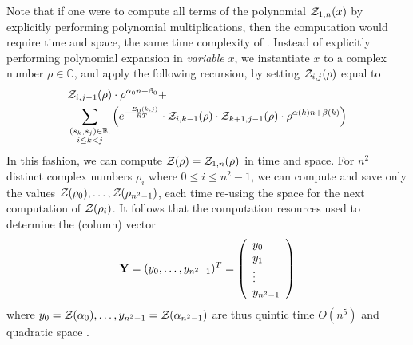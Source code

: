 Note that if one were to compute all terms of the polynomial ${\mathcal Z}_{1,n}(x)$
by explicitly performing polynomial multiplications,
then the computation would require  time and  space, the
same time complexity of \cite{hofacker:RNAbor2D}.
Instead of explicitly performing polynomial expansion in {\em variable} $x$,
we instantiate $x$ to a
complex number $\rho \in \mathbb{C}$, and apply
the following recursion, by setting ${\mathcal Z}_{i,j}(\rho)$ equal to
\begin{align}
\label{eq:RNAborNussRecursionInstantiated}
&\emZof{i,j-1}{\rho} \cdot \rho^{\alpha_0n+\beta_0} + \\
&\sum_{\substack{(s_k,s_j) \in \bpSet,\\i\le k<j}}
\left(e^{\frac{-E_0(k,j)}{RT}}\cdot
\emZof{i,k-1}{\rho} \cdot \emZof{k+1,j-1}{\rho}
\cdot \rho^{\alpha(k)n+\beta(k)} \right) \nonumber
\end{align}
In this fashion, we can compute ${\mathcal Z}_{}(\rho)={\mathcal Z}_{1,n}(\rho)$ in
 time and  space. For $n^2$ distinct complex numbers
$\rho_i$ where $0 \leq i \leq n^2-1$, we can compute and save only the
values ${\mathcal Z}_{}(\rho_0),\dots, {\mathcal Z}_{}(\rho_{n^2-1})$, each time re-using the
 space for the next computation of ${\mathcal Z}_{}(\rho_i)$.
It follows that
the computation resources used to determine the (column) vector
\begin{align}
\label{eq:defY}
{\bf Y} = (y_0,\dots,y_{n^2-1})^T =
\left(
\begin{array}{l}
y_0\\
y_1\\
\vdots \\
y_{n^2-1}\\
\end{array}
\right)
\end{align}
where
$y_0={\mathcal Z}_{}(\alpha_0),\dots, y_{n^2-1}={\mathcal Z}_{}(\alpha_{n^2-1})$ are thus
quintic time $O(n^5)$ and quadratic space .


